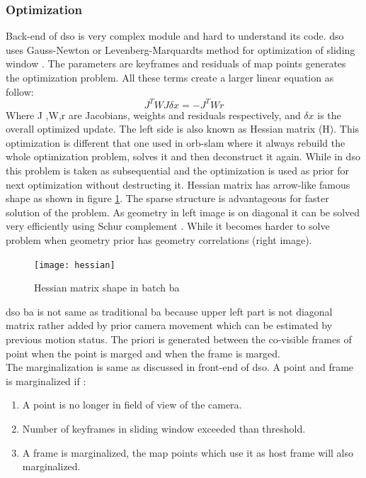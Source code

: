 \subsubsection{Optimization}
Back-end of \acrshort{dso} is very complex module and hard to understand its code. \acrshort{dso} uses Gauss-Newton or Levenberg-Marquardts method for optimization of sliding window \cite{Engel-et-al-pami2018}. The parameters are keyframes and residuals of map points generates the optimization problem. All these terms create a larger linear equation as follow: 
\begin{equation*}
J^{T}WJ\delta x= -J^{T}Wr
\end{equation*} 
Where J ,W,r are Jacobians, weights and residuals respectively, and $ \delta x $ is the overall optimized update. The left side is also known as Hessian matrix (H). This optimization is different that one used in \acrshort{orb}-\acrshort{slam} where it always rebuild the whole optimization problem, solves it and then deconstruct it again. While in \acrshort{dso} this problem is taken as subsequential and the optimization is used as prior for next optimization without destructing it. Hessian matrix has arrow-like famous shape as shown in figure \ref{fig:hessiain}. The sparse structure is advantageous for faster solution of the problem. As geometry in left image is on diagonal it can be solved very efficiently using Schur complement \cite{Engel-et-al-pami2018}. While it becomes harder to solve problem when geometry prior has geometry correlations (right image).   
\begin{figure}[h!]
	\centering
	\texttt{[image: hessian]}
	\caption{Hessian matrix shape in batch \acrshort{ba} \cite{Engel-et-al-pami2018}}
	\label{fig:hessiain}
\end{figure}
\acrshort{dso} \acrshort{ba} is not same as traditional \acrshort{ba} because upper left part is not diagonal matrix rather added by prior camera movement which can be estimated by previous motion status. The priori is generated between the co-visible frames of point when the point is marged and when the frame is marged. \\
\newline
The marginalization is same as discussed in front-end of \acrshort{dso}. A point and frame is marginalized if :
\begin{enumerate}
	\item A point is no longer in field of view of the camera.
	\item Number of keyframes in sliding window exceeded than threshold.  
	\item A frame is marginalized, the map points which use it as host frame will also marginalized.
\end{enumerate}

